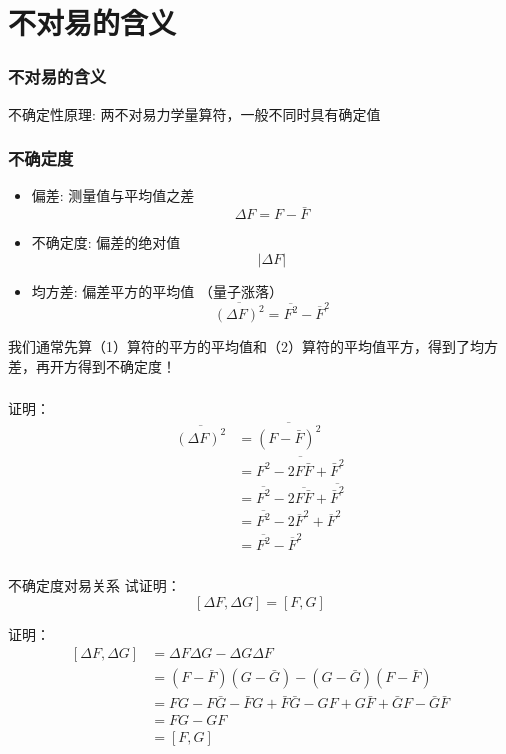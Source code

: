 \section{不对易的含义}
\begin{frame} 
    \frametitle{不对易的含义}
    \begin{tcolorbox1}{不确定性原理:}
        两不对易力学量算符，一般不同时具有确定值    
    \end{tcolorbox1}
\end{frame} 

\begin{frame} 
    \frametitle{不确定度}
    \begin{itemize}
        \item 偏差: 测量值与平均值之差
        $$ \Delta F=F-\bar{F} $$
        \item 不确定度: 偏差的绝对值
         $$ \left | \Delta F  \right | $$
        \item 均方差: 偏差平方的平均值 （量子涨落）
        $$ \overline{(\Delta F)^2} = \overline{F^2} - \overline{F}^2$$
    \end{itemize}   
    我们通常先算（1）算符的平方的平均值和（2）算符的平均值平方，得到了均方差，再开方得到不确定度！
\end{frame} 


\begin{frame} 
    \frametitle{}
    \alert{证明：}
    \begin{equation*}
        \begin{split} 
        \overline{(\Delta F)^2}&= \overline{(F-\bar{F})^2}\\
        &=\overline{F^2-2F\bar{F}+\bar{F}^2 }\\
        &=\overline{F^2} -2\overline{F\bar{F}} +\overline{\bar{F}^2 }\\
        &=\overline{F^2} -2\overline{F}^2 +\overline{F}^2\\
        &= \overline{F^2} - \overline{F}^2
        \end{split}  
    \end{equation*} 
\end{frame} 

\begin{frame} 
    \frametitle{}
    \begin{tcolorbox2}{不确定度对易关系}
     试证明：  $$[\Delta F, \Delta G]= [F, G]$$
    \end{tcolorbox2}
    \alert{证明：}
    \begin{equation*}
        \begin{split} 
        [\Delta F, \Delta G]&= \Delta F \Delta G - \Delta G \Delta F \\
        &=(F-\bar{F}) (G-\bar{G})- (G-\bar{G}) (F-\bar{F}) \\
        &=FG -F\bar{G}-\bar{F}G + \bar{F} \bar{G} -GF + G \bar{F} + \bar{G} F -\bar{G} \bar{F}   \\
        &=FG-GF \\
        &=[F, G]
        \end{split}  
    \end{equation*} 
\end{frame} 

